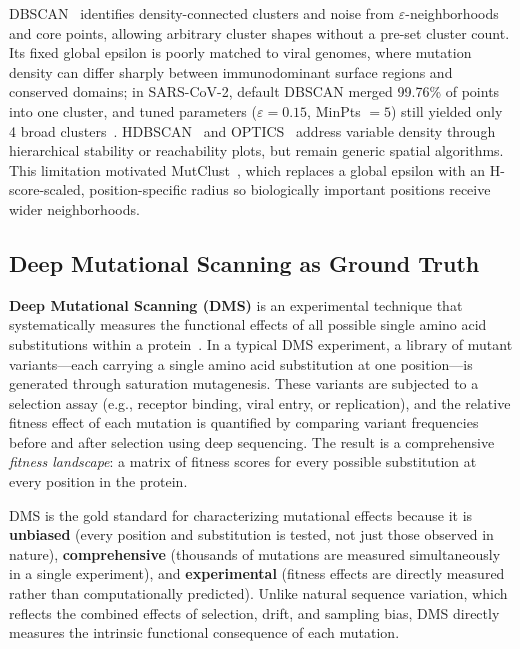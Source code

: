 DBSCAN~\cite{ester1996dbscan} identifies density-connected clusters and noise from $\varepsilon$-neighborhoods and core points, allowing arbitrary cluster shapes without a pre-set cluster count.
Its fixed global epsilon is poorly matched to viral genomes, where mutation density can differ sharply between immunodominant surface regions and conserved domains; in SARS-CoV-2, default DBSCAN merged 99.76\% of points into one cluster, and tuned parameters ($\varepsilon = 0.15$, MinPts $= 5$) still yielded only 4 broad clusters~\cite{youn2025mutclust}.
HDBSCAN~\cite{campello2013hdbscan} and OPTICS~\cite{ankerst1999optics} address variable density through hierarchical stability or reachability plots, but remain generic spatial algorithms.
This limitation motivated MutClust~\cite{youn2025mutclust}, which replaces a global epsilon with an H-score-scaled, position-specific radius so biologically important positions receive wider neighborhoods.

\subsection{Deep Mutational Scanning as Ground Truth}
\label{subsec:bg_dms}

\textbf{Deep Mutational Scanning (DMS)} is an experimental technique that systematically measures the functional effects of all possible single amino acid substitutions within a protein~\cite{fowler2014dms}.
In a typical DMS experiment, a library of mutant variants---each carrying a single amino acid substitution at one position---is generated through saturation mutagenesis.
These variants are subjected to a selection assay (e.g., receptor binding, viral entry, or replication), and the relative fitness effect of each mutation is quantified by comparing variant frequencies before and after selection using deep sequencing.
The result is a comprehensive \textit{fitness landscape}: a matrix of fitness scores for every possible substitution at every position in the protein.

DMS is the gold standard for characterizing mutational effects because it is \textbf{unbiased} (every position and substitution is tested, not just those observed in nature), \textbf{comprehensive} (thousands of mutations are measured simultaneously in a single experiment), and \textbf{experimental} (fitness effects are directly measured rather than computationally predicted).
Unlike natural sequence variation, which reflects the combined effects of selection, drift, and sampling bias, DMS directly measures the intrinsic functional consequence of each mutation.

